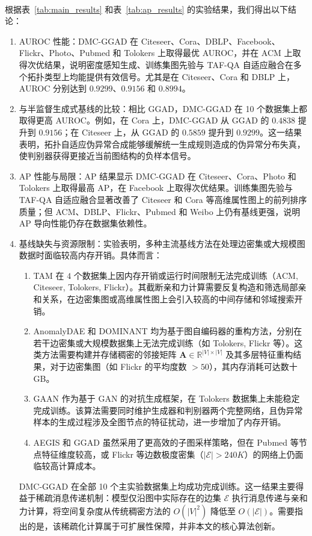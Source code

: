 ﻿﻿﻿﻿    \documentclass[conference, onecolumn]{IEEEtran}
\begin{document}
    根据表~\ref{tab:main_results} 和表~\ref{tab:ap_results} 的实验结果，我们得出以下结论：
    \begin{enumerate}
        \item AUROC 性能：DMC-GGAD 在 Citeseer、Cora、DBLP、Facebook、Flickr、Photo、Pubmed 和 Tolokers 上取得最优 AUROC，并在 ACM 上取得次优结果，说明密度感知生成、训练集图先验与 TAF-QA 自适应融合在多个拓扑类型上均能提供有效信号。尤其是在 Citeseer、Cora 和 DBLP 上，AUROC 分别达到 $0.9299$、$0.9156$ 和 $0.8994$。
        \item 与半监督生成式基线的比较：相比 GGAD，DMC-GGAD 在 10 个数据集上都取得更高 AUROC。例如，在 Cora 上，DMC-GGAD 从 GGAD 的 $0.4838$ 提升到 $0.9156$；在 Citeseer 上，从 GGAD 的 $0.5859$ 提升到 $0.9299$。这一结果表明，拓扑自适应伪异常合成能够缓解统一生成规则造成的伪异常分布失真，使判别器获得更接近当前图结构的负样本信号。
        \item AP 性能与局限：AP 结果显示 DMC-GGAD 在 Citeseer、Cora、Photo 和 Tolokers 上取得最高 AP，在 Facebook 上取得次优结果。训练集图先验与 TAF-QA 自适应融合显著改善了 Citeseer 和 Cora 等高维属性图上的前列排序质量；但 ACM、DBLP、Flickr、Pubmed 和 Weibo 上仍有基线更强，说明 AP 导向性能仍存在数据集依赖性。
        \item 基线缺失与资源限制：实验表明，多种主流基线方法在处理边密集或大规模图数据时面临较高内存开销。具体而言：
        \begin{enumerate}
            \item TAM 在 $4$ 个数据集上因内存开销或运行时间限制无法完成训练（ACM, Citeseer, Tolokers, Flickr）。其截断亲和力计算需要反复构造和筛选局部亲和关系，在边密集图或高维属性图上会引入较高的中间存储和邻域搜索开销。
            \item AnomalyDAE 和 DOMINANT 均为基于图自编码器的重构方法，分别在若干边密集或大规模数据集上无法完成训练（如 Tolokers, Flickr 等）。这类方法需要构建并存储稠密的邻接矩阵 $\mathbf{A} \in \mathbb{R}^{|V| \times |V|}$ 及其多层特征重构结果，对于边密集图（如 Flickr 的平均度数 $> 50$），其内存消耗可达数十 GB。
            \item GAAN 作为基于 GAN 的对抗生成框架，在 Tolokers 数据集上未能稳定完成训练。该算法需要同时维护生成器和判别器两个完整网络，且伪异常样本的生成过程涉及全图节点的特征扰动，进一步增加了内存开销。
            \item AEGIS 和 GGAD 虽然采用了更高效的子图采样策略，但在 Pubmed 等节点特征维度较高，或 Flickr 等边数极度密集（$|\mathcal{E}| > 240K$）的网络上仍面临较高计算成本。
        \end{enumerate}
        
        DMC-GGAD 在全部 10 个主实验数据集上均成功完成训练。这一结果主要得益于稀疏消息传递机制：模型仅沿图中实际存在的边集 $\mathcal{E}$ 执行消息传递与亲和力计算，将空间复杂度从传统稠密方法的 $O(|V|^2)$ 降低至 $O(|\mathcal{E}|)$。需要指出的是，该稀疏化计算属于可扩展性保障，并非本文的核心算法创新。
    \end{enumerate}
    
\end{document}
